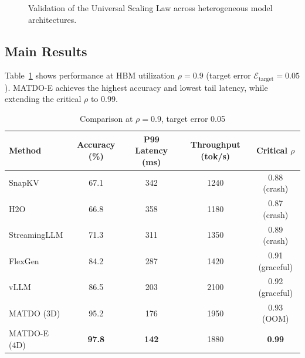 \documentclass[11pt,a4paper]{article}
\theoremstyle{plain}
\theoremstyle{definition}
\begin{document}
\begin{figure}[t]
\centering
{}
\caption{Validation of the Universal Scaling Law across heterogeneous model architectures.}
\label{fig:cross_scaling}
\end{figure}

\subsection{Main Results}
Table~\ref{tab:main} shows performance at HBM utilization $\rho=0.9$ (target error $\mathcal{E}_{\text{target}}=0.05$). MATDO-E achieves the highest accuracy and lowest tail latency, while extending the critical $\rho$ to 0.99.

\begin{table}[t]
\centering
\caption{Comparison at $\rho=0.9$, target error 0.05}
\begin{tabular}{@{}lcccc@{}}
\toprule
Method & Accuracy (\%) & P99 Latency (ms) & Throughput (tok/s) & Critical $\rho$ \\
\midrule
SnapKV & 67.1 & 342 & 1240 & 0.88 (crash) \\
H2O & 66.8 & 358 & 1180 & 0.87 (crash) \\
StreamingLLM & 71.3 & 311 & 1350 & 0.89 (crash) \\
FlexGen & 84.2 & 287 & 1420 & 0.91 (graceful) \\
vLLM & 86.5 & 203 & 2100 & 0.92 (graceful) \\
MATDO (3D) & 95.2 & 176 & 1950 & 0.93 (OOM) \\
MATDO-E (4D) & \textbf{97.8} & \textbf{142} & 1880 & \textbf{0.99} \\
\bottomrule
\end{tabular}
\label{tab:main}
\end{table}
\end{document}
